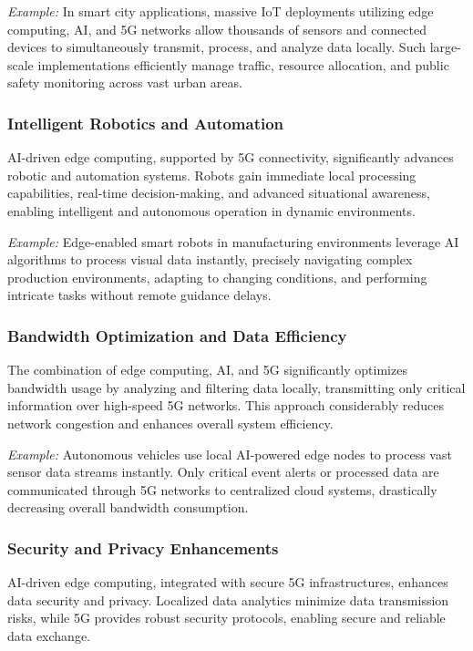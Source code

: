 \documentclass[runningheads]{llncs}
\begin{document}
\noindent\textit{Example:} In smart city applications, massive IoT deployments utilizing edge computing, AI, and 5G networks allow thousands of sensors and connected devices to simultaneously transmit, process, and analyze data locally. Such large-scale implementations efficiently manage traffic, resource allocation, and public safety monitoring across vast urban areas.

\subsubsection{Intelligent Robotics and Automation}
AI-driven edge computing, supported by 5G connectivity, significantly advances robotic and automation systems. Robots gain immediate local processing capabilities, real-time decision-making, and advanced situational awareness, enabling intelligent and autonomous operation in dynamic environments.

\noindent\textit{Example:} Edge-enabled smart robots in manufacturing environments leverage AI algorithms to process visual data instantly, precisely navigating complex production environments, adapting to changing conditions, and performing intricate tasks without remote guidance delays.

\subsubsection{Bandwidth Optimization and Data Efficiency}
The combination of edge computing, AI, and 5G significantly optimizes bandwidth usage by analyzing and filtering data locally, transmitting only critical information over high-speed 5G networks. This approach considerably reduces network congestion and enhances overall system efficiency.

\noindent\textit{Example:} Autonomous vehicles use local AI-powered edge nodes to process vast sensor data streams instantly. Only critical event alerts or processed data are communicated through 5G networks to centralized cloud systems, drastically decreasing overall bandwidth consumption.

\subsubsection{Security and Privacy Enhancements}
AI-driven edge computing, integrated with secure 5G infrastructures, enhances data security and privacy. Localized data analytics minimize data transmission risks, while 5G provides robust security protocols, enabling secure and reliable data exchange.
\end{document}

